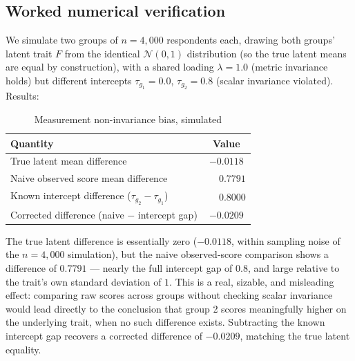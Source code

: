 \documentclass[10pt,journal,compsoc]{IEEEtran}
\begin{document}
\subsection{Worked numerical verification}
We simulate two groups of $n=4{,}000$ respondents each, drawing both groups' latent trait $F$ from the identical $\mathcal N(0,1)$ distribution (so the true latent means are equal by construction), with a shared loading $\lambda=1.0$ (metric invariance holds) but different intercepts $\tau_{g_1}=0.0$, $\tau_{g_2}=0.8$ (scalar invariance violated). Results:

\begin{table}[h]
\centering
\caption{Measurement non-invariance bias, simulated}
\begin{tabular}{lc}
\toprule
\textbf{Quantity} & \textbf{Value} \\
\midrule
True latent mean difference & $-0.0118$ \\
Naive observed score mean difference & $\phantom{-}0.7791$ \\
Known intercept difference ($\tau_{g_2}-\tau_{g_1}$) & $\phantom{-}0.8000$ \\
Corrected difference (naive $-$ intercept gap) & $-0.0209$ \\
\bottomrule
\end{tabular}
\end{table}

The true latent difference is essentially zero ($-0.0118$, within sampling noise of the $n=4{,}000$ simulation), but the naive observed-score comparison shows a difference of $0.7791$ — nearly the full intercept gap of $0.8$, and large relative to the trait's own standard deviation of $1$. This is a real, sizable, and misleading effect: comparing raw scores across groups without checking scalar invariance would lead directly to the conclusion that group 2 scores meaningfully higher on the underlying trait, when no such difference exists. Subtracting the known intercept gap recovers a corrected difference of $-0.0209$, matching the true latent equality.
\end{document}

